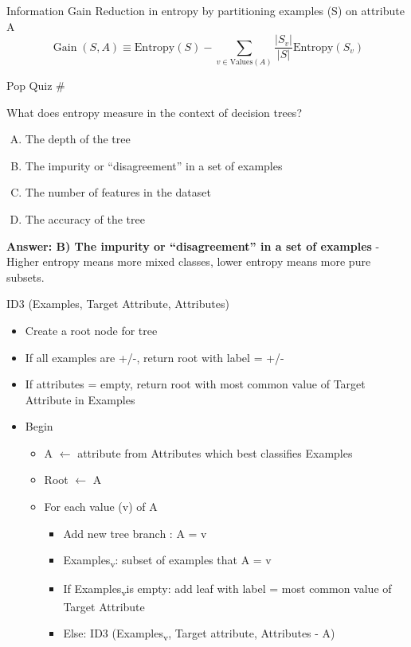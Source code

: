 \documentclass[usenames,dvipsnames]{beamer}
\newcounter{popquiz}
\begin{document}
\begin{frame}{Information Gain}
 Reduction in entropy
by partitioning examples (S) on attribute A
$$
\operatorname{Gain}(S, A) \equiv \text{Entropy}(S)-\sum_{v \in \text{Values}(A)} \frac{|S_{v}|}{|S|} \text{Entropy}(S_{v})
$$
\end{frame}

\begin{frame}{Pop Quiz \#\thepopquiz}
\begin{tcolorbox}[colback=blue!5!white,colframe=blue!75!black,title=Quick Question!]
What does entropy measure in the context of decision trees?
\begin{enumerate}[A)]
\item The depth of the tree
\item The impurity or ``disagreement'' in a set of examples
\item The number of features in the dataset
\item The accuracy of the tree
\end{enumerate}
\pause
\textbf{Answer: B) The impurity or ``disagreement'' in a set of examples} - Higher entropy means more mixed classes, lower entropy means more pure subsets.
\end{tcolorbox}
\end{frame}


\begin{frame}{ID3 (Examples, Target Attribute, Attributes)}
\begin{itemize}[<+->]
	\item Create a root node for tree
	\item If all examples are +/-, return root with label = +/-
	\item  If attributes = empty, return root with most common value of
	Target Attribute in Examples
	\item Begin
	\begin{itemize}[<+->]
		\item A $\leftarrow$ attribute from Attributes which best classifies
		Examples
		\item 	Root $\leftarrow$ A
		\item  For each value (v) of A
		\begin{itemize}[<+->]
			\item Add new tree branch : A = v
			\item  Examples\textsubscript{v}: subset of examples that A = v
			\item If Examples\textsubscript{v}is empty: add leaf with label = most
			common value of Target Attribute
			\item Else: ID3 (Examples\textsubscript{v}, Target attribute, Attributes - {A})
		\end{itemize}
	\end{itemize}


\end{itemize}
\end{frame}
\end{document}
